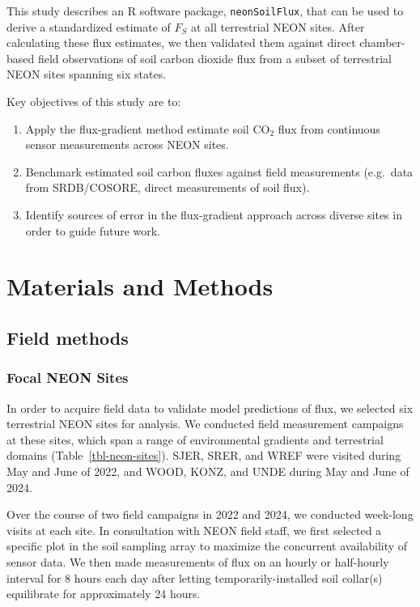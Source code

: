 \documentclass[
  letterpaper,
  DIV=11,
  numbers=noendperiod]{scrartcl}
\providecommand{\tightlist}{%
  \setlength{\itemsep}{0pt}\setlength{\parskip}{0pt}}\usepackage{longtable,booktabs,array}
\begin{document}
This study describes an R software package, \texttt{neonSoilFlux}, that
can be used to derive a standardized estimate of \(F_{S}\) at all
terrestrial NEON sites. After calculating these flux estimates, we then
validated them against direct chamber-based field observations of soil
carbon dioxide flux from a subset of terrestrial NEON sites spanning six
states.

Key objectives of this study are to:

\begin{enumerate}
\def\labelenumi{\arabic{enumi}.}
\tightlist
\item
  Apply the flux-gradient method estimate soil CO\(_{2}\) flux from
  continuous sensor measurements across NEON sites.
\item
  Benchmark estimated soil carbon fluxes against field measurements
  (e.g.~data from SRDB/COSORE, direct measurements of soil flux).
\item
  Identify sources of error in the flux-gradient approach across diverse
  sites in order to guide future work.
\end{enumerate}

\section{Materials and Methods}\label{materials-and-methods}

\subsection{Field methods}\label{field-methods}

\subsubsection{Focal NEON Sites}\label{focal-neon-sites}

In order to acquire field data to validate model predictions of flux, we
selected six terrestrial NEON sites for analysis. We conducted field
measurement campaigns at these sites, which span a range of
environmental gradients and terrestrial domains
(Table~\ref{tbl-neon-sites}). SJER, SRER, and WREF were visited during
May and June of 2022, and WOOD, KONZ, and UNDE during May and June of
2024.

Over the course of two field campaigns in 2022 and 2024, we conducted
week-long visits at each site. In consultation with NEON field staff, we
first selected a specific plot in the soil sampling array to maximize
the concurrent availability of sensor data. We then made measurements of
flux on an hourly or half-hourly interval for 8 hours each day after
letting temporarily-installed soil collar(s) equilibrate for
approximately 24 hours.
\end{document}
